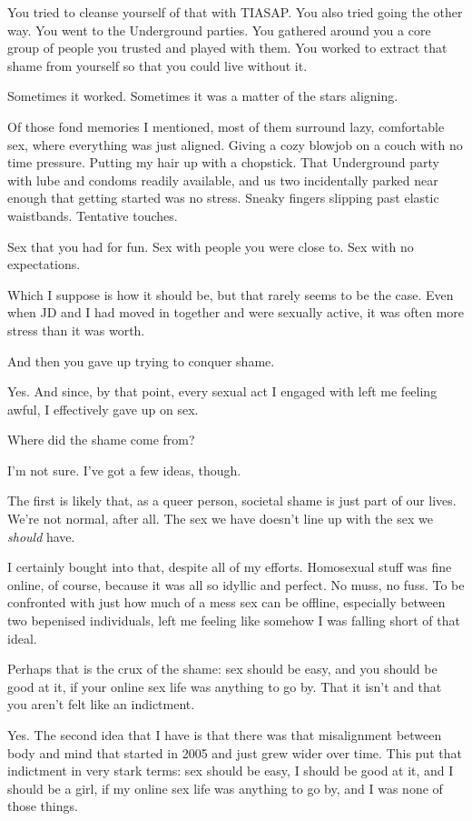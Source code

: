 \begin{paracol}{2}
\begin{leftcolumn}
\begin{ally}
You tried to cleanse yourself of that with TIASAP. You also tried going the other way. You went to the Underground parties. You gathered around you a core group of people you trusted and played with them. You worked to extract that shame from yourself so that you could live without it.
\end{ally}
Sometimes it worked. Sometimes it was a matter of the stars aligning.

Of those fond memories I mentioned, most of them surround lazy, comfortable sex, where everything was just aligned. Giving a cozy blowjob on a couch with no time pressure. Putting my hair up with a chopstick. That Underground party with lube and condoms readily available, and us two incidentally parked near enough that getting started was no stress. Sneaky fingers slipping past elastic waistbands. Tentative touches.

\begin{ally}
Sex that you had for fun. Sex with people you were close to. Sex with no expectations.
\end{ally}
Which I suppose is how it should be, but that rarely seems to be the case. Even when JD and I had moved in together and were sexually active, it was often more stress than it was worth.

\begin{ally}
And then you gave up trying to conquer shame.
\end{ally}
Yes. And since, by that point, every sexual act I engaged with left me feeling awful, I effectively gave up on sex.
\newpage

\begin{ally}
Where did the shame come from?
\end{ally}
I'm not sure. I've got a few ideas, though.

The first is likely that, as a queer person, societal shame is just part of our lives. We're not normal, after all. The sex we have doesn't line up with the sex we \emph{should} have.

I certainly bought into that, despite all of my efforts. Homosexual stuff was fine online, of course, because it was all so idyllic and perfect. No muss, no fuss. To be confronted with just how much of a mess sex can be offline, especially between two bepenised individuals, left me feeling like somehow I was falling short of that ideal.

\begin{ally}
Perhaps that is the crux of the shame: sex should be easy, and you should be good at it, if your online sex life was anything to go by. That it isn't and that you aren't felt like an indictment.
\end{ally}
Yes. The second idea that I have is that there was that misalignment between body and mind that started in 2005 and just grew wider over time. This put that indictment in very stark terms: sex should be easy, I should be good at it, and I should be a girl, if my online sex life was anything to go by, and I was none of those things.


\end{leftcolumn}
\end{paracol}
